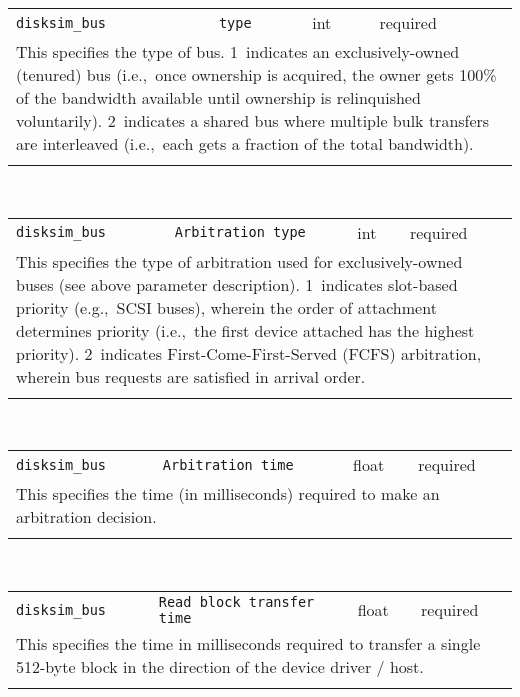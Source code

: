 \noindent 
\begin{tabular}{|p{\lpmodwidth}|p{\lpnamewidth}|p{0.5in}|p{0.5in}|}
\cline{1-4}
\texttt{disksim\_bus} & \texttt{type} & int & required \\ 
\cline{1-4}
\multicolumn{4}{|p{6in}|}{
This specifies the type of bus. 1~indicates an exclusively-owned
(tenured) bus (i.e.,~once ownership is acquired, the owner gets 100\%
of the bandwidth available until ownership is relinquished
voluntarily). 2~indicates a shared bus where multiple bulk transfers
are interleaved (i.e.,~each gets a fraction of the total bandwidth).
}\\ 
\cline{1-4}
\multicolumn{4}{p{5in}}{}\\
\end{tabular}\\ 
\noindent 
\begin{tabular}{|p{\lpmodwidth}|p{\lpnamewidth}|p{0.5in}|p{0.5in}|}
\cline{1-4}
\texttt{disksim\_bus} & \texttt{Arbitration type} & int & required \\ 
\cline{1-4}
\multicolumn{4}{|p{6in}|}{
This specifies the type of arbitration used for exclusively-owned buses
(see above parameter description). 1~indicates slot-based priority
(e.g.,~SCSI buses), wherein the order of attachment determines
priority (i.e.,~the first device attached has the highest priority).
2~indicates First-Come-First-Served (FCFS) arbitration, wherein bus
requests are satisfied in arrival order.
}\\ 
\cline{1-4}
\multicolumn{4}{p{5in}}{}\\
\end{tabular}\\ 
\noindent 
\begin{tabular}{|p{\lpmodwidth}|p{\lpnamewidth}|p{0.5in}|p{0.5in}|}
\cline{1-4}
\texttt{disksim\_bus} & \texttt{Arbitration time} & float & required \\ 
\cline{1-4}
\multicolumn{4}{|p{6in}|}{
This specifies the time (in milliseconds) required to make
an arbitration decision.
}\\ 
\cline{1-4}
\multicolumn{4}{p{5in}}{}\\
\end{tabular}\\ 
\noindent 
\begin{tabular}{|p{\lpmodwidth}|p{\lpnamewidth}|p{0.5in}|p{0.5in}|}
\cline{1-4}
\texttt{disksim\_bus} & \texttt{Read block transfer time} & float & required \\ 
\cline{1-4}
\multicolumn{4}{|p{6in}|}{
This specifies the time in milliseconds required to transfer a single
512-byte block in the direction of the device driver / host.
}\\ 
\cline{1-4}
\multicolumn{4}{p{5in}}{}\\
\end{tabular}\\ 
